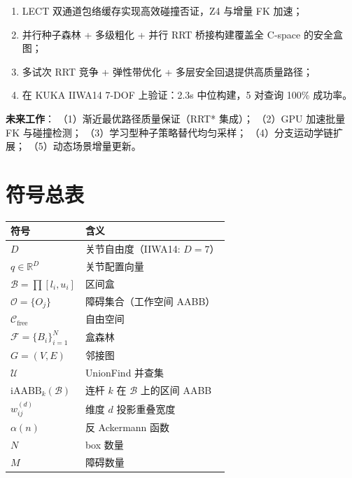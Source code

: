 \documentclass[11pt,a4paper]{article}
\begin{document}
\begin{enumerate}[nosep]
  \item LECT 双通道包络缓存实现高效碰撞否证，Z4 与增量 FK 加速；
  \item 并行种子森林 + 多级粗化 + 并行 RRT 桥接构建覆盖全 C-space 的安全盒图；
  \item 多试次 RRT 竞争 + 弹性带优化 + 多层安全回退提供高质量路径；
  \item 在 KUKA IIWA14 7-DOF 上验证：2.3s 中位构建，5 对查询 100\% 成功率。
\end{enumerate}

\textbf{未来工作}：
（1）渐近最优路径质量保证（RRT* 集成）；
（2）GPU 加速批量 FK 与碰撞检测；
（3）学习型种子策略替代均匀采样；
（4）分支运动学链扩展；
（5）动态场景增量更新。

\appendix

\section{符号总表}
\label{app:notation}

\begin{table}[ht]
\centering
\small
\begin{tabular}{@{}ll@{}}
\toprule
\textbf{符号} & \textbf{含义} \\
\midrule
$D$ & 关节自由度（IIWA14: $D=7$） \\
$q \in \mathbb{R}^D$ & 关节配置向量 \\
$\mathcal{B} = \prod [l_i, u_i]$ & 区间盒 \\
$\mathcal{O} = \{O_j\}$ & 障碍集合（工作空间 AABB） \\
$\mathcal{C}_{\mathrm{free}}$ & 自由空间 \\
$\mathcal{F} = \{B_i\}_{i=1}^N$ & 盒森林 \\
$G = (V, E)$ & 邻接图 \\
$\mathcal{U}$ & UnionFind 并查集 \\
$\mathrm{iAABB}_k(\mathcal{B})$ & 连杆 $k$ 在 $\mathcal{B}$ 上的区间 AABB \\
$w_{ij}^{(d)}$ & 维度 $d$ 投影重叠宽度 \\
$\alpha(n)$ & 反 Ackermann 函数 \\
$N$ & box 数量 \\
$M$ & 障碍数量 \\
\bottomrule
\end{tabular}
\end{table}
\end{document}
